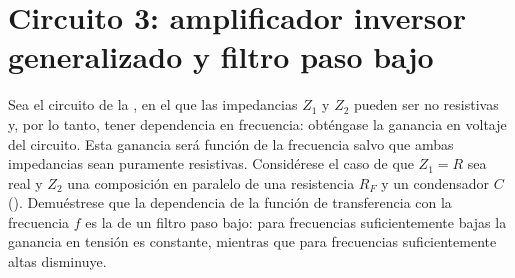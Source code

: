 \section{Circuito 3: amplificador inversor generalizado y filtro paso bajo}\label{sec:pl-filtro}
\begin{prelab}\label{pl:filtro}
Sea el circuito de la , en el que las impedancias $Z_1$ y $Z_2$ pueden
ser no resistivas y, por lo tanto, tener dependencia en frecuencia: obténgase la ganancia en voltaje
del circuito. Esta ganancia será función de la frecuencia salvo que ambas impedancias sean puramente
resistivas. Considérese el caso de que $Z_1=R$ sea real y $Z_2$ una composición en paralelo de una
resistencia $R_F$ y un condensador $C$ (). Demuéstrese que la dependencia
de la función de transferencia con la frecuencia $f$ es la de un filtro paso bajo: para frecuencias
suficientemente bajas la ganancia en tensión es constante, mientras que para frecuencias
suficientemente altas disminuye.
\end{prelab}



